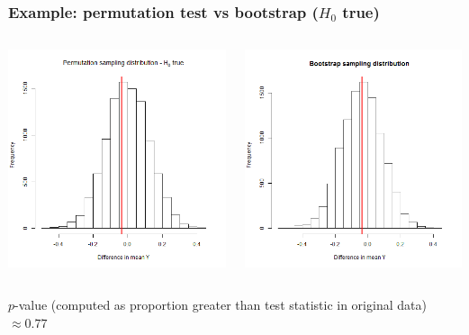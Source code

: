 \documentclass[12pt, 
hyperref={colorlinks=true, linkcolor=blue, urlcolor=cyan}]{beamer}
\newcommand{\myframe}[1]{\begin{frame} \frametitle{#1}}
\begin{document}
\myframe{Example: permutation test vs bootstrap ($H_0$ true)}
\begin{columns}
\begin{column}{.5\textwidth}
\includegraphics[width = 1\textwidth]{perm_true_null.png}
\end{column}
\begin{column}{.5\textwidth}
\includegraphics[width = 1\textwidth]{boot.png}
\end{column}
\end{columns}
$p$-value (computed as proportion greater than test statistic in original data) $\approx 0.77$
\end{frame}
\end{document}
